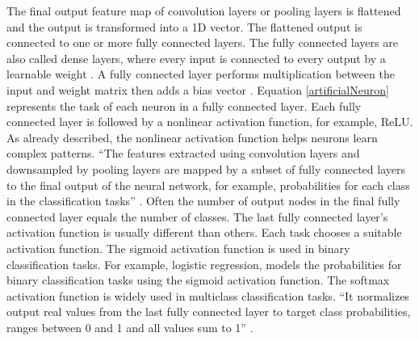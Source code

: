 The final output feature map of convolution layers or pooling layers is flattened and the output is transformed into a \ac{1D} vector. The flattened output is connected to one or more fully connected layers. The fully connected layers are also called dense layers, where every input is connected to every output by a learnable weight \cite{articleCNNs}. A fully connected layer performs multiplication between the input and weight matrix then adds a bias vector \cite{articleCNNs}. Equation \ref{artificialNeuron} represents the task of each neuron in a fully connected layer. Each fully connected layer is followed by a nonlinear activation function, for example, \ac{ReLU}. As already described, the nonlinear activation function helps neurons learn complex patterns. ``The features extracted using convolution layers and downsampled by pooling layers are mapped by a subset of fully connected layers to the final output of the neural network, for example, probabilities for each class in the classification tasks'' \cite{articleCNNs}. Often the number of output nodes in the final fully connected layer equals the number of classes. The last fully connected layer's activation function is usually different than others. Each task chooses a suitable activation function. The sigmoid activation function is used in binary classification tasks. For example, logistic regression, models the probabilities for binary classification tasks using the sigmoid activation function\footnotemark. The softmax activation function is widely used in multiclass classification tasks. ``It normalizes output real values from the last fully connected layer to target class probabilities, ranges between 0 and 1 and all values sum to 1'' \cite{articleCNNs}.

































